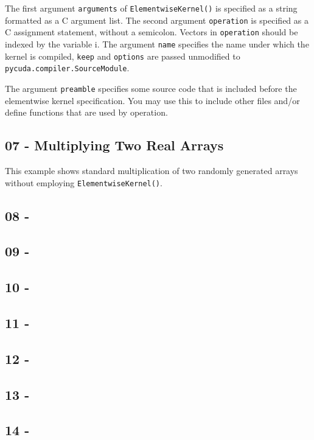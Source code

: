 \documentclass[article,A4,12pt]{llncs}
\begin{document}
The first argument {\tt arguments} of {\tt ElementwiseKernel()} is specified as a string formatted as 
a C argument list. The second argument {\tt operation} is specified as a C assignment statement, 
without a semicolon. Vectors in {\tt operation} should be indexed by the variable i. The argument 
{\tt name} specifies the name under which the kernel is compiled, {\tt keep} and {\tt options} 
are passed unmodified to {\tt pycuda.compiler.SourceModule}.

The argument {\tt preamble} specifies some source code that is included before the elementwise 
kernel specification. You may use this to include other files and/or define functions that 
are used by operation.

\subsection{07 - Multiplying Two Real Arrays}

This example shows standard multiplication of two randomly generated 
arrays without employing {\tt ElementwiseKernel()}. 

\subsection{08 - }

\subsection{09 - }

\subsection{10 - }

\subsection{11 - }

\subsection{12 - }

\subsection{13 - }

\subsection{14 - }
\end{document}

